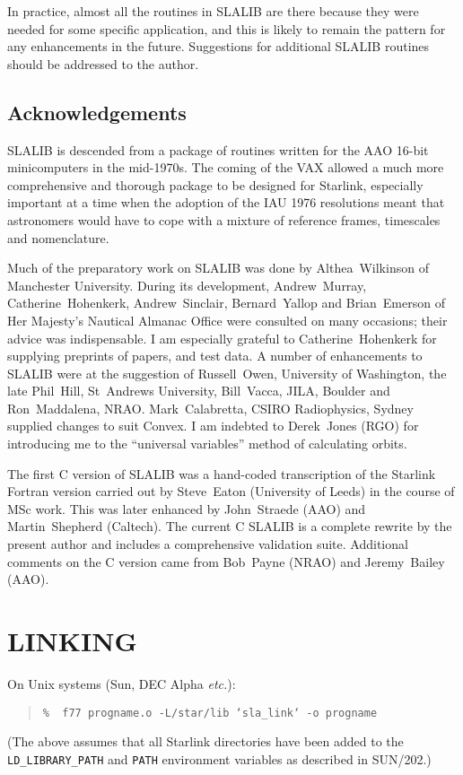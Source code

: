 \documentclass[11pt,twoside]{article}
\begin{document}
In practice, almost all the routines in SLALIB are there because they were
needed for some specific application, and this is likely to remain the
pattern for any enhancements in the future.
Suggestions for additional SLALIB routines should be addressed to the
author.

\subsection{Acknowledgements}
SLALIB is descended from a package of routines written
for the AAO 16-bit minicomputers
in the mid-1970s.  The coming of the VAX
allowed a much more comprehensive and thorough package
to be designed for Starlink, especially important
at a time when the adoption
of the IAU 1976 resolutions meant that astronomers
would have to cope with a mixture of reference frames,
timescales and nomenclature.

Much of the preparatory work on SLALIB was done by
Althea~Wilkinson of Manchester University.
During its development,
Andrew~Murray,
Catherine~Hohenkerk,
Andrew~Sinclair,
Bernard~Yallop
and
Brian~Emerson of Her Majesty's Nautical Almanac Office were consulted
on many occasions; their advice was indispensable.
I am especially grateful to
Catherine~Hohenkerk
for supplying preprints of papers, and test data. A number of
enhancements to SLALIB were at the suggestion of
Russell~Owen, University of Washington,
the late Phil~Hill, St~Andrews University,
Bill~Vacca, JILA, Boulder and
Ron~Maddalena, NRAO.
Mark~Calabretta, CSIRO Radiophysics, Sydney supplied changes to suit Convex.
I am indebted to Derek~Jones (RGO) for introducing me to the
``universal variables'' method of calculating orbits.

The first C version of SLALIB was a hand-coded transcription
of the Starlink Fortran version carried out by
Steve~Eaton (University of Leeds) in the course of
MSc work.  This was later
enhanced by John~Straede (AAO) and Martin~Shepherd (Caltech).
The current C SLALIB is a complete rewrite by the present author and
includes a comprehensive validation suite.
Additional comments on the C version came from Bob~Payne (NRAO) and
Jeremy~Bailey (AAO).

\section{LINKING}

On Unix systems (Sun, DEC Alpha {\it etc.}):
\begin{verse}
{\tt \%~~f77 progname.o -L/star/lib `sla\_link` -o progname}
\end{verse}
(The above assumes that all Starlink directories have been added to
the {\tt LD\_LIBRARY\_PATH} and {\tt PATH} environment variables
as described in SUN/202.)
\end{document}
